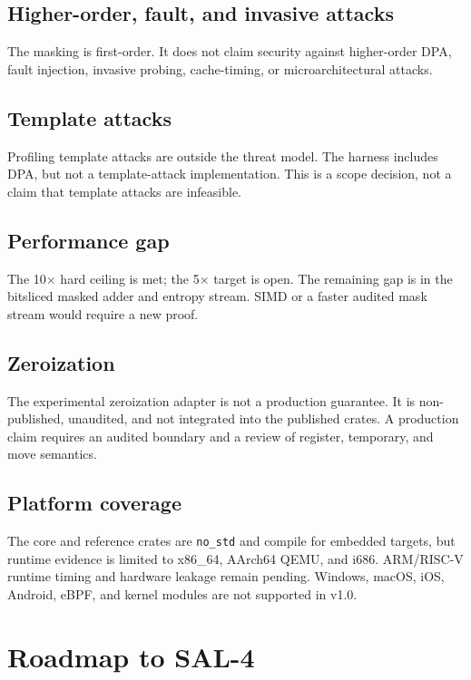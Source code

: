 \documentclass[11pt,a4paper]{article}
\newcommand{\code}[1]{\texttt{#1}}
\theoremstyle{plain}
\theoremstyle{definition}
\theoremstyle{remark}
\begin{document}
\subsection{Higher-order, fault, and invasive attacks}

The masking is first-order. It does not claim security against higher-order DPA,
fault injection, invasive probing, cache-timing, or microarchitectural attacks.

\subsection{Template attacks}

Profiling template attacks are outside the threat model. The harness includes DPA, but
not a template-attack implementation. This is a scope decision, not a claim that
template attacks are infeasible.

\subsection{Performance gap}

The 10$\times$ hard ceiling is met; the 5$\times$ target is open. The remaining gap is
in the bitsliced masked adder and entropy stream. SIMD or a faster audited mask stream
would require a new proof.

\subsection{Zeroization}

The experimental zeroization adapter is not a production guarantee. It is
non-published, unaudited, and not integrated into the published crates. A production
claim requires an audited boundary and a review of register, temporary, and move
semantics.

\subsection{Platform coverage}

The core and reference crates are \code{no\_std} and compile for embedded targets, but
runtime evidence is limited to x86\_64, AArch64 QEMU, and i686. ARM/RISC-V runtime
timing and hardware leakage remain pending. Windows, macOS, iOS, Android, eBPF, and
kernel modules are not supported in v1.0.

\section{Roadmap to SAL-4}\label{sec:roadmap}
\end{document}
